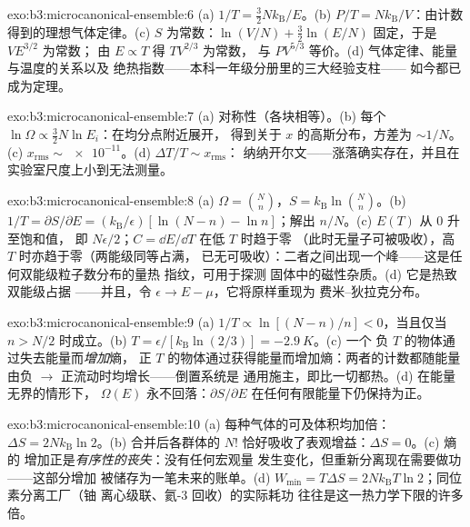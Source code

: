 \begin{solution}{exo:b3:microcanonical-ensemble:6}
(a) $1/T = \tfrac32 Nk_{\text{B}}/E$。(b) $P/T =
Nk_{\text{B}}/V$：由计数得到的理想气体定律。(c)
$S$ 为常数：$\ln(V/N) + \tfrac32\ln(E/N)$ 固定，于是 $VE^{3/2}$ 为常数；
由 $E \propto T$ 得 $TV^{2/3}$ 为常数，
与 $PV^{5/3}$ 等价。(d) 气体定律、能量与温度的关系以及
绝热指数——本科一年级分册里的三大经验支柱——
如今都已成为定理。
\end{solution}

\begin{solution}{exo:b3:microcanonical-ensemble:7}
(a) 对称性（各块相等）。(b) 每个 $\ln\Omega \propto
\tfrac32 N\ln E_i$：在均分点附近展开，
得到关于 $x$ 的高斯分布，方差为 $\sim1/N$。(c) $x_{\text{rms}} \sim
\num{e-11}$。(d) $\Delta T/T \sim x_{\text{rms}}$：
纳纳开尔文——涨落确实存在，并且在
实验室尺度上小到无法测量。
\end{solution}

\begin{solution}{exo:b3:microcanonical-ensemble:8}
(a) $\Omega = \binom Nn$，$S = k_{\text{B}}\ln\binom Nn$。(b)
$1/T = \partial S/\partial E = (k_{\text{B}}/\epsilon)[\ln(N-n) -
\ln n]$；解出 $n/N$。(c) $E(T)$ 从 $0$ 升至饱和值，
即 $N\epsilon/2$；$C = \dd E/\dd T$ 在低 $T$ 时趋于零
（此时无量子可被吸收），高 $T$ 时亦趋于零（两能级同等占满，
已无可吸收）：二者之间出现一个峰——这是任何双能级粒子数分布的量热
指纹，可用于探测
固体中的磁性杂质。(d) 它是热致双能级占据
——并且，令 $\epsilon \to E - \mu$，它将原样重现为
费米–狄拉克分布。
\end{solution}

\begin{solution}{exo:b3:microcanonical-ensemble:9}
(a) $1/T \propto \ln[(N-n)/n] < 0$，当且仅当 $n > N/2$ 时成立。(b)
$T = \epsilon/[k_{\text{B}}\ln(2/3)] = -\qty{2.9}{K}$。(c) 一个
负 $T$ 的物体通过失去能量而\emph{增加}熵，
正 $T$ 的物体通过获得能量而增加熵：两者的计数都随能量
由负 $\to$ 正流动时均增长——倒置系统是
通用施主，即比一切都热。(d) 在能量无界的情形下，
$\Omega(E)$ 永不回落：$\partial S/\partial E$
在任何有限能量下仍保持为正。
\end{solution}

\begin{solution}{exo:b3:microcanonical-ensemble:10}
(a) 每种气体的可及体积均加倍：$\Delta S =
2Nk_{\text{B}}\ln2$。(b) 合并后各群体的 $N!$
恰好吸收了表观增益：$\Delta S = 0$。(c) 熵的
增加正是\emph{有序性的丧失}：没有任何宏观量
发生变化，但重新分离现在需要做功——这部分增加
被储存为一笔未来的账单。(d) $W_{\min} = T\Delta S =
2Nk_{\text{B}}T\ln2$；同位素分离工厂（铀
离心级联、氦-3 回收）的实际耗功
往往是这一热力学下限的许多倍。
\end{solution}

